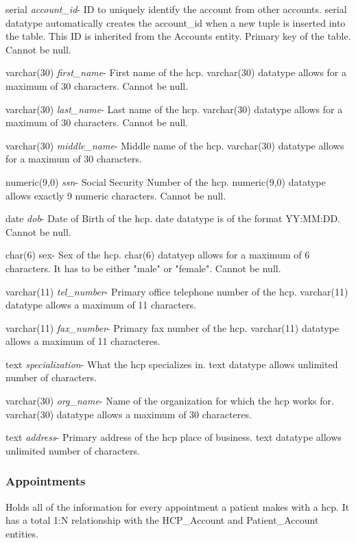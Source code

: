\documentclass[12pt]{report}
\begin{document}
\begin{description}
\item serial \textit{account\_id}- ID to uniquely identify the account from other accounts. serial datatype automatically creates the account\_id when a new tuple is inserted into the table.  This ID is inherited from the Accounts entity. Primary key of the table.  Cannot be null.
\item varchar(30) \textit{first\_name}-  First name of the hcp.  varchar(30) datatype allows for a maximum of 30 characters.  Cannot be null.
\item varchar(30) \textit{last\_name}- Last name of the hcp.  varchar(30) datatype allows for a maximum of 30 characters.  Cannot be null.
\item varchar(30) \textit{middle\_name}- Middle name of the hcp. varchar(30) datatype allows for a maximum of 30 characters.
\item numeric(9,0) \textit{ssn}- Social Security Number of the hcp. numeric(9,0) datatype allows exactly 9 numeric characters.  Cannot be null.
\item date \textit{dob}- Date of Birth of the hcp.  date datatype is of the format YY:MM:DD.  Cannot be null.
\item char(6) sex- Sex of the hcp. char(6) datatyep allows for a maximum of 6 characters.  It has to be either "male" or "female".  Cannot be null.
\item varchar(11) \textit{tel\_number}- Primary office telephone number of the hcp.  varchar(11) datatype allows a maximum of 11 characters.
\item varchar(11) \textit{fax\_number}- Primary fax number of the hcp.  varchar(11) datatype allows a maximum of 11 characteres.
\item text \textit{specialization}- What the hcp specializes in.  text datatype allows unlimited number of characters.
\item varchar(30) \textit{org\_name}- Name of the organization for which the hcp works for.  varchar(30) datatype allows a maximum of 30 characteres.
\item text \textit{address}- Primary address of the hcp place of business.  text datatype allows unlimited number of characters.
\end{description}

\subsubsection{Appointments}
Holds all of the information for every appointment a patient makes with a hcp.  It has a total 1:N relationship with the HCP\_Account and Patient\_Account entities.
\end{document}
